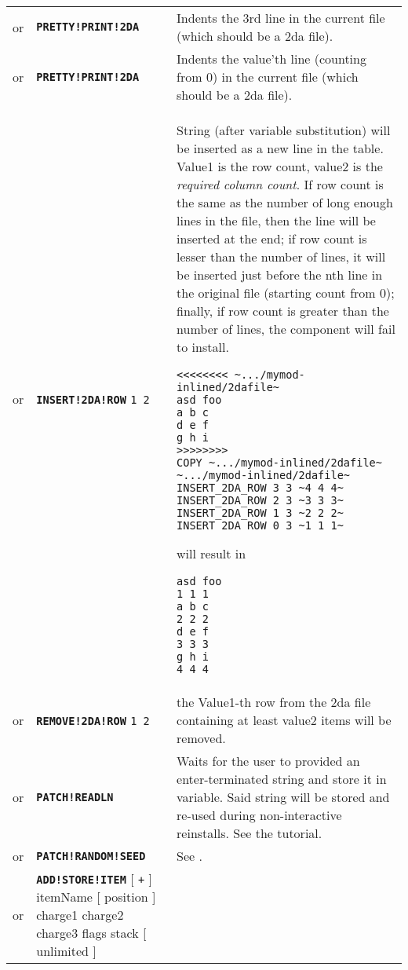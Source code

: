 \documentclass{article}
\def\ttref#1{\ahrefloc{#1}{\tt #1}}
\def\DEFINE#1{{\tt \bf #1}\label{#1}\index{#1}}
\def\DEFSYN#1{{\tt \bf #1}\index{#1}}
\def\t#1{{\tt #1}}
\def\Ob{{\color{red} [ }}
\def\Oe{{\color{red} ] }}
\begin{document}
\begin{tabular}{cp{10in}|p{10in}}
or & \DEFINE{PRETTY!PRINT!2DA} & Indents the 3rd line in the current file (which
  should be a  2da file). \\
or & \DEFSYN{PRETTY!PRINT!2DA} \ttref{value} & Indents the value'th line
(counting from 0) in the current file (which should be a 2da file). \\
or & \DEFINE{INSERT!2DA!ROW} \t{\ttref{value}1 \ttref{value}2 \ttref{String}} &
  String (after variable substitution) will be inserted as a new line in the table.
  Value1 is the row count, value2 is the \emph{required column count}. If row count is
  the same as the number of long enough lines in the file, then the line will be inserted
  at the end; if row count is lesser than the number of lines, it will be inserted just before
  the nth line in the original file (starting count from 0); finally, if row count is greater
  than the number of lines, the component will fail to install.
\begin{verbatim}
<<<<<<<< ~.../mymod-inlined/2dafile~
asd foo
a b c
d e f
g h i
>>>>>>>>
COPY ~.../mymod-inlined/2dafile~ ~.../mymod-inlined/2dafile~
INSERT_2DA_ROW 3 3 ~4 4 4~
INSERT_2DA_ROW 2 3 ~3 3 3~
INSERT_2DA_ROW 1 3 ~2 2 2~
INSERT_2DA_ROW 0 3 ~1 1 1~
\end{verbatim}
will result in
\begin{verbatim}
asd foo
1 1 1
a b c
2 2 2
d e f
3 3 3
g h i
4 4 4
\end{verbatim} \\
or & \DEFINE{REMOVE!2DA!ROW} \t{\ttref{value}1 \ttref{value}2} &
  the Value1-th row from the 2da file containing at least value2 items will be removed.
\\
or & \DEFINE{PATCH!READLN} \ttref{variable} &
  Waits for the user to provided an enter-terminated string and store it in
  variable. Said string will be stored and re-used during non-interactive reinstalls. See the
  \ttref{READLN} tutorial. \\
or & \DEFINE{PATCH!RANDOM!SEED} \ttref{value} &
  See \ttref{RANDOM!SEED}. \\
or & \DEFSYN{ADD!STORE!ITEM} \Ob \t{+} \Oe itemName \Ob position \Oe
  charge1 charge2 charge3 flags stack \Ob unlimited \Oe &


\end{tabular}
\end{document}
